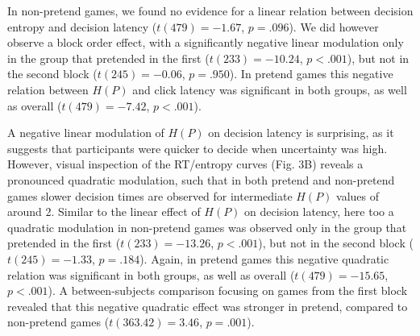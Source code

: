\documentclass[10pt, letterpaper]{article}
\begin{document}
In non-pretend games, we found no evidence for a linear relation between
decision entropy and decision latency (\(t(479) = -1.67\),
\(p = .096\)). We did however observe a block order effect, with a
significantly negative linear modulation only in the group that
pretended in the first (\(t(233) = -10.24\), \(p < .001\)), but not in
the second block (\(t(245) = -0.06\), \(p = .950\)). In pretend games
this negative relation between \(H(P)\) and click latency was
significant in both groups, as well as overall (\(t(479) = -7.42\),
\(p < .001\)).

A negative linear modulation of \(H(P)\) on decision latency is
surprising, as it suggests that participants were quicker to decide when
uncertainty was high. However, visual inspection of the RT/entropy
curves (Fig. 3B) reveals a pronounced quadratic modulation, such that in
both pretend and non-pretend games slower decision times are observed
for intermediate \(H(P)\) values of around 2. Similar to the linear
effect of \(H(P)\) on decision latency, here too a quadratic modulation
in non-pretend games was observed only in the group that pretended in
the first (\(t(233) = -13.26\), \(p < .001\)), but not in the second
block (\(t(245) = -1.33\), \(p = .184\)). Again, in pretend games this
negative quadratic relation was significant in both groups, as well as
overall (\(t(479) = -15.65\), \(p < .001\)). A between-subjects
comparison focusing on games from the first block revealed that this
negative quadratic effect was stronger in pretend, compared to
non-pretend games (\(t(363.42) = 3.46\), \(p = .001\)).
\end{document}
